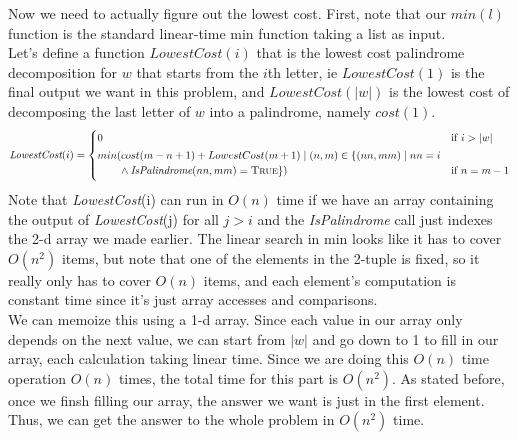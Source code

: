 \documentclass[11pt]{article}
\begin{document}
\begin{solution}
Now we need to actually figure out the lowest cost. First, note that our $min(l)$ function is the standard linear-time min function taking a list as input. 
\\ Let's define a function $LowestCost(i)$ that is the lowest cost palindrome decomposition for $w$ that starts from the $i$th letter, ie $LowestCost(1)$ is the final output we want in this problem, and $LowestCost(|w|)$ is the lowest cost of decomposing the last letter of $w$ into a palindrome, namely $cost(1)$.
\[
    \emph{LowestCost}(i) =
	\begin{cases}
		0 & \text{if $i > |w|$}
\\[0.5ex]
        min(cost(m - n + 1) + LowestCost(m + 1) \mid (n, m) \in \{(nn, mm) \mid nn = i 
        \\ \qquad{} \wedge \emph{IsPalindrome}(nn, mm) = \textsc{True}\}) & \text{if $n = m - 1$}
\\[0.5ex]
	\end{cases}
\]
Note that \emph{LowestCost}(i) can run in $O(n)$ time if we have an array containing the output of \emph{LowestCost}(j) for all $j > i$ and the \emph{IsPalindrome} call just indexes the 2-d array we made earlier. The linear search in min looks like it has to cover $O(n^2)$ items, but note that one of the elements in the 2-tuple is fixed, so it really only has to cover $O(n)$ items, and each element's computation is constant time since it's just array accesses and comparisons.
\\ We can memoize this using a 1-d array. Since each value in our array only depends on the next value, we can start from $|w|$ and go down to 1 to fill in our array, each calculation taking linear time. Since we are doing this $O(n)$ time operation $O(n)$ times, the total time for this part is $O(n^2)$. As stated before, once we finsh filling our array, the answer we want is just in the first element. Thus, we can get the answer to the whole problem in $O(n^2)$ time.
\end{solution}
\end{document}
